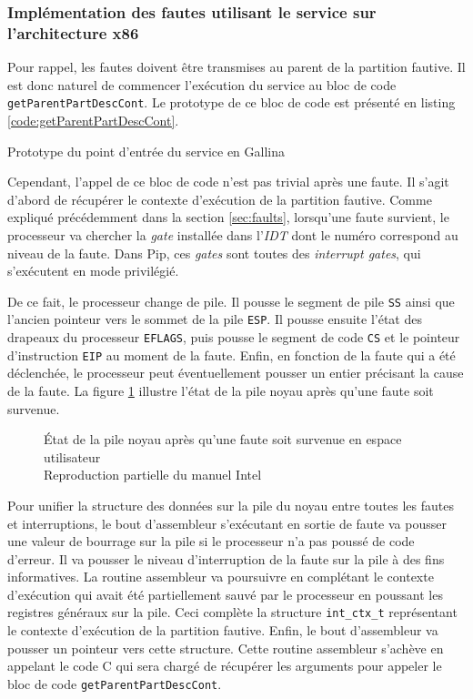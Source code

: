 		\subsubsection{Implémentation des fautes utilisant le service sur l'architecture x86}

		Pour rappel, les fautes doivent être transmises au parent de la partition fautive. Il est donc naturel de commencer l'exécution du service au bloc de code \texttt{getParentPartDescCont}. Le prototype de ce bloc de code est présenté en listing \ref{code:getParentPartDescCont}.

		\begin{listing}[!ht]
			\caption{Prototype du point d'entrée du service en Gallina}
			\label{code:getParentPartDescCont}
		\end{listing}

		Cependant, l'appel de ce bloc de code n'est pas trivial après une faute. Il s'agit d'abord de récupérer le contexte d'exécution de la partition fautive. Comme expliqué précédemment dans la section \ref{sec:faults}, lorsqu'une faute survient, le processeur va chercher la \emph{gate} installée dans l'\emph{IDT} dont le numéro correspond au niveau de la faute. Dans Pip, ces \emph{gates} sont toutes des \emph{interrupt gates}, qui s'exécutent en mode privilégié.

		De ce fait, le processeur change de pile. Il pousse le segment de pile \texttt{SS} ainsi que l'ancien pointeur vers le sommet de la pile \texttt{ESP}. Il pousse ensuite l'état des drapeaux du processeur \texttt{EFLAGS}, puis pousse le segment de code \texttt{CS} et le pointeur d'instruction \texttt{EIP} au moment de la faute. Enfin, en fonction de la faute qui a été déclenchée, le processeur peut éventuellement pousser un entier précisant la cause de la faute. La figure \ref{fig:proc_interrupt_stack} illustre l'état de la pile noyau après qu'une faute soit survenue.

		\begin{figure}[!ht]
			
			\caption{État de la pile noyau après qu'une faute soit survenue en espace utilisateur\\Reproduction partielle du manuel Intel \cite{intel_interrupt_stack}}
			\label{fig:proc_interrupt_stack}
		\end{figure}

		Pour unifier la structure des données sur la pile du noyau entre toutes les fautes et interruptions, le bout d'assembleur s'exécutant en sortie de faute va pousser une valeur de bourrage sur la pile si le processeur n'a pas poussé de code d'erreur. Il va pousser le niveau d'interruption de la faute sur la pile à des fins informatives. La routine assembleur va poursuivre en complétant le contexte d'exécution qui avait été partiellement sauvé par le processeur en poussant les registres généraux sur la pile. Ceci complète la structure \texttt{int\_ctx\_t} représentant le contexte d'exécution de la partition fautive. Enfin, le bout d'assembleur va pousser un pointeur vers cette structure. Cette routine assembleur s'achève en appelant le code C qui sera chargé de récupérer les arguments pour appeler le bloc de code \texttt{getParentPartDescCont}.

